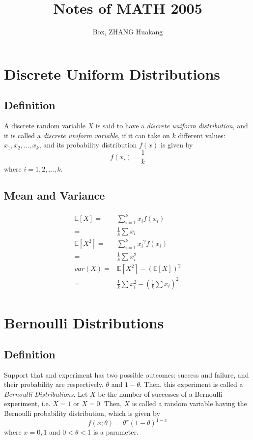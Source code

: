 \documentclass[titlepage]{article}
\title{Notes of MATH 2005}
\author{Box, ZHANG Huakang}
\begin{document}
    \maketitle
    \section{Discrete Uniform Distributions}
        \subsection*{Definition}
            A discrete random variable $X$ is said to have a \textit{discrete uniform distribution}, and it is called a \textit{discrete uniform variable}, if it can take on $k$ different values: $x_1,x_2,...,x_k$, and its probability distribution $f(x)$ is given by
            $$f(x_i)=\frac{1}{k}$$
            where $i=1,2,...,k$.

        \subsection*{Mean and Variance}
            \paragraph{
                \begin{equation*}
                    \begin{split}
                        \mathbb{E}[X]=&\sum_{i=1}^k x_if(x_i)\\
                        =&\frac{1}{k}\sum x_i\\
                        \mathbb{E}[X^2]=&\sum_{i=1}^k {x_i}^2f(x_i)\\
                        =&\frac{1}{k}\sum x_i^2\\
                        var(X)=&\mathbb{E}[X^2]-(\mathbb{E}[X])^2\\
                        =&\frac{1}{k}\sum x_i^2-(\frac{1}{k}\sum x_i)^2\\
                    \end{split}
                \end{equation*}
            }

    \section{Bernoulli Distributions}
        \subsection*{Definition}
            Support that and experiment has two possible outcomes: success and failure, and their probability are respectively, $\theta$ and $1-\theta$. Then, this experiment is called a \textit{Bernoulli Distributions}. Let $X$ be the number of successes of a Bernoulli experiment, i.e. $X=1$ or $X=0$. Then, $X$ is called a random variable having the Bernoulli probability distribution, which is given by
            $$f(x;\theta)=\theta^x(1-\theta)^{1-x}$$
            where $x=0,1$ and $0<\theta<1$ is a parameter.
\end{document}
